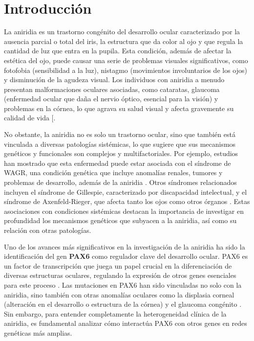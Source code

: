 \section{Introducción}

La aniridia es un trastorno congénito del desarrollo ocular caracterizado por la
ausencia parcial o total del iris, la estructura que da color al ojo y que regula la
cantidad de luz que entra en la pupila. Esta condición, además de afectar la estética
del ojo, puede causar una serie de problemas visuales significativos, como fotofobia (sensibilidad a la luz), nistagmo (movimientos involuntarios de los ojos) y
disminución de la agudeza visual. Los individuos con aniridia a menudo presentan
malformaciones oculares asociadas, como cataratas, glaucoma (enfermedad ocular
que daña el nervio óptico, esencial para la visión) y problemas en la córnea, lo que agrava su
salud visual y afecta gravemente su calidad de vida [\cite{Landsend2021}.


No obstante, la aniridia no es solo un trastorno ocular, sino que también está
vinculada a diversas patologías sistémicas, lo que sugiere que sus mecanismos
genéticos y funcionales son complejos y multifactoriales\cite{BLACK2022389}. Por ejemplo, estudios
han mostrado que esta enfermedad puede estar asociada con el síndrome de
WAGR, una condición genética que incluye anomalías renales, tumores y problemas de desarrollo, además de la aniridia \cite{lopezrelacion}. Otros síndromes relacionados incluyen el síndrome de Gillespie, caracterizado por discapacidad intelectual, y el síndrome de Axenfeld-Rieger, que afecta tanto los ojos como otros órganos \cite{Law2011}. Estas asociaciones con condiciones sistémicas destacan la importancia de investigar en profundidad los mecanismos genéticos que subyacen
a la aniridia, así como su relación con otras patologías.


Uno de los avances más significativos en la investigación de la aniridia ha sido la 
identificación del gen \textbf{PAX6} como regulador clave del desarrollo ocular. PAX6 es un factor de transcripción que juega un papel crucial en
la diferenciación de diversas estructuras oculares, regulando la expresión de otros genes esenciales para este proceso \cite{robles_lopez_2012}. Las mutaciones en PAX6 han sido vinculadas
no solo con la aniridia, sino también con otras anomalías oculares como la displasia corneal (alteración en el desarrollo o estructura de la córnea) y el glaucoma
congénito  \cite{CalvaoPires2014}. Sin embargo, para entender completamente la heterogeneidad clínica de la aniridia, es fundamental analizar cómo interactúa
PAX6 con otros genes en redes genéticas más amplias.


